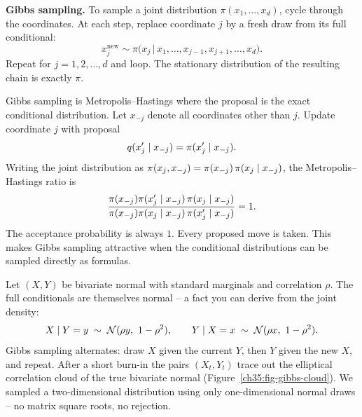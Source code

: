 \begin{formalbox}
\textbf{Gibbs sampling.} To sample a joint distribution
$\pi(x_1, \dots, x_d)$, cycle through the coordinates. At each step, replace
coordinate $j$ by a fresh draw from its full conditional:
\[
  x_j^{\text{new}} \sim \pi\bigl(x_j \,\big|\, x_1,\dots,x_{j-1},
     x_{j+1},\dots,x_d\bigr).
\]
Repeat for $j = 1, 2, \dots, d$ and loop. The stationary distribution of the
resulting chain is exactly $\pi$.
\end{formalbox}

Gibbs sampling is Metropolis--Hastings where the proposal is the exact
conditional distribution. Let $x_{-j}$ denote all coordinates other than $j$.
Update coordinate $j$ with proposal
\[
  q(x_j' \mid x_{-j}) = \pi(x_j' \mid x_{-j}).
\]
Writing the joint distribution as $\pi(x_j, x_{-j}) = \pi(x_{-j})\,\pi(x_j \mid x_{-j})$, the Metropolis--Hastings ratio is
\[
  \frac{\pi(x_{-j})\pi(x_j' \mid x_{-j})\,\pi(x_j \mid x_{-j})}{\pi(x_{-j})\pi(x_j \mid x_{-j})\,\pi(x_j' \mid x_{-j})} = 1.
\]
The acceptance probability is always $1$. Every proposed move is taken.
This makes Gibbs sampling attractive when the conditional distributions can be sampled directly as formulas.

\begin{example}
\label{ch35:ex-gibbs}
Let $(X, Y)$ be bivariate normal with standard marginals and correlation $\rho$.
The full conditionals are themselves normal -- a fact you can derive from the
joint density:
\[
  X \mid Y = y \;\sim\; \mathcal{N}(\rho y,\ 1 - \rho^2), \qquad
  Y \mid X = x \;\sim\; \mathcal{N}(\rho x,\ 1 - \rho^2).
\]
Gibbs sampling alternates: draw $X$ given the current $Y$, then $Y$ given the new
$X$, and repeat. After a short burn-in the pairs $(X_t, Y_t)$ trace out the
elliptical correlation cloud of the true bivariate normal
(Figure~\ref{ch35:fig-gibbs-cloud}). We sampled a
two-dimensional distribution using only one-dimensional normal draws -- no matrix
square roots, no rejection.
\end{example}

